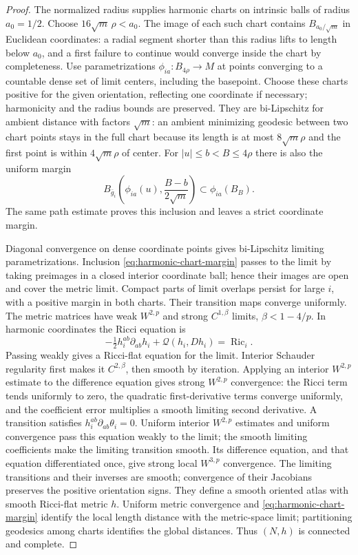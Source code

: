 \documentclass[11pt]{article}
\numberwithin{equation}{section}
\theoremstyle{definition}
\theoremstyle{remark}
\DeclareMathOperator{\Ric}{Ric}
\begin{document}
\begin{proof}
The normalized radius supplies harmonic charts on intrinsic
balls of radius \(a_0=1/2\). Choose
\(16\sqrt m\,\rho<a_0\). The image of each such chart contains
\(B_{a_0/\sqrt m}\) in Euclidean coordinates: a radial segment
shorter than this radius lifts to length below \(a_0\), and a
first failure to continue would converge inside the chart by
completeness. Use parametrizations \(\phi_{ia}:B_{4\rho}\to M\)
at points converging to a countable dense set of limit centers,
including the basepoint. Choose these charts positive for the
given orientation, reflecting one coordinate if necessary;
harmonicity and the radius bounds are preserved. They are bi-Lipschitz for ambient
distance with factors \(\sqrt m\): an ambient minimizing
geodesic between two chart points stays in the full chart
because its length is at most \(8\sqrt m\rho\) and the first
point is within \(4\sqrt m\rho\) of center.
For \(|u|\le b<B\le4\rho\) there is also the uniform margin
\begin{equation}\label{eq:harmonic-chart-margin}
 B_{\bar g_i}\left(\phi_{ia}(u),\frac{B-b}{2\sqrt m}\right)
                  \subset\phi_{ia}(B_B).
\end{equation}
The same path estimate proves this inclusion and leaves a
strict coordinate margin.

Diagonal convergence on dense coordinate points gives
bi-Lipschitz limiting parametrizations. Inclusion
\eqref{eq:harmonic-chart-margin} passes to the limit by taking
preimages in a closed interior coordinate ball; hence their
images are open and cover the metric limit. Compact parts of
limit overlaps persist for large \(i\), with a positive
margin in both charts. Their transition maps converge uniformly.
The metric matrices have weak \(W^{2,p}\) and strong
\(C^{1,\beta}\) limits, \(\beta<1-4/p\).
In harmonic coordinates the Ricci equation is
\[
 -\tfrac12 h_i^{ab}\partial_{ab}h_i+
          \mathcal Q(h_i,Dh_i)=\Ric_i.
\]
Passing weakly gives a Ricci-flat equation for the limit.
Interior Schauder regularity first makes it \(C^{2,\beta}\),
then smooth by iteration. Applying an interior \(W^{2,p}\)
estimate to the difference equation gives strong
\(W^{2,p}\) convergence: the Ricci term tends uniformly to
zero, the quadratic first-derivative terms converge uniformly,
and the coefficient error multiplies a smooth limiting second
derivative. A transition satisfies \(h_i^{ab}\partial_{ab}\theta_i=0\).
Uniform interior \(W^{2,p}\) estimates and uniform convergence
pass this equation weakly to the limit; the smooth limiting
coefficients make the limiting transition smooth. Its difference
equation, and that equation differentiated once, give strong local
\(W^{3,p}\) convergence. The limiting transitions and their inverses
are smooth; convergence of their Jacobians preserves the positive
orientation signs. They define a smooth oriented atlas with
smooth Ricci-flat metric \(h\).
Uniform metric convergence and \eqref{eq:harmonic-chart-margin}
identify the local length distance with the metric-space limit;
partitioning geodesics among charts identifies the global distances.
Thus \((N,h)\) is connected and complete.


\end{proof}
\end{document}
